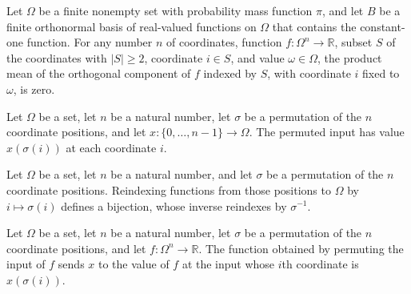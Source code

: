 \begin{theorem}
\label{FABL.FiniteFourierBasis.productMean_restrict_orthogonalComponent_eq_zero}
\leanok
{}
Let $\Omega$ be a finite nonempty set with probability mass function $\pi$, and let $B$
be a finite orthonormal basis of real-valued functions on $\Omega$ that contains the
constant-one function. For any number $n$ of coordinates, function
$f\colon\Omega^n\to\mathbb R$, subset $S$ of the coordinates with $|S|\ge2$, coordinate
$i\in S$, and value $\omega\in\Omega$, the product mean of the orthogonal component of
$f$ indexed by $S$, with coordinate $i$ fixed to $\omega$, is zero.
\end{theorem}

\begin{definition}
\label{FABL.permuteProductInput}
\leanok
Let $\Omega$ be a set, let $n$ be a natural number, let $\sigma$ be a permutation of the
$n$ coordinate positions, and let $x\colon\{0,\ldots,n-1\}\to\Omega$. The permuted input
has value $x(\sigma(i))$ at each coordinate $i$.
\end{definition}

\begin{definition}
\label{FABL.permuteProductInputEquiv}
\leanok
{}
Let $\Omega$ be a set, let $n$ be a natural number, and let $\sigma$ be a permutation of
the $n$ coordinate positions. Reindexing functions from those positions to $\Omega$ by
$i\mapsto\sigma(i)$ defines a bijection, whose inverse reindexes by $\sigma^{-1}$.
\end{definition}

\begin{definition}
\label{FABL.permuteProductFunction}
\leanok
{}
Let $\Omega$ be a set, let $n$ be a natural number, let $\sigma$ be a permutation of the
$n$ coordinate positions, and let $f\colon\Omega^n\to\mathbb R$. The function obtained
by permuting the input of $f$ sends $x$ to the value of $f$ at the input whose $i$th
coordinate is $x(\sigma(i))$.
\end{definition}

